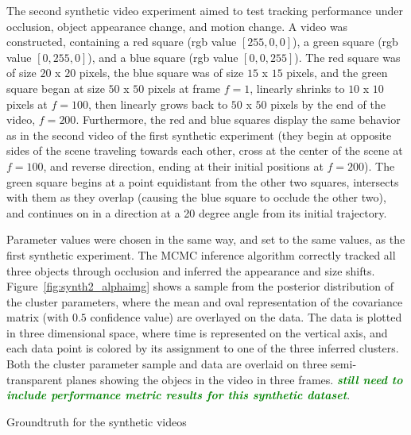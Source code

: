 \documentclass[smallcondensed, final]{svjour3}
\newcommand{\willie}[1]{\textcolor{green}{\textsf{\emph{\textbf{\textcolor{green}{#1}}}}}}
\begin{document}

The second synthetic video experiment aimed to test tracking performance under occlusion, object appearance change, and motion change. A video was constructed, containing a red square (rgb value $[255,0,0]$), a green square (rgb value $[0,255,0]$), and a blue square (rgb value $[0,0,255]$). The red square was of size $20$ x $20$ pixels, the blue square was of size $15$ x $15$ pixels, and the green square began at size $50$ x $50$ pixels at frame $f=1$, linearly shrinks to $10$ x $10$ pixels at $f=100$, then linearly grows back to $50$ x $50$ pixels by the end of the video, $f=200$. Furthermore, the red and blue squares display the same behavior as in the second video of the first synthetic experiment (they begin at opposite sides of the scene traveling towards each other, cross at the center of the scene at $f=100$, and reverse direction, ending at their initial positions at $f=200$). The green square begins at a point equidistant from the other two squares, intersects with them as they overlap (causing the blue square to occlude the other two), and continues on in a direction at a 20 degree angle from its initial trajectory.

Parameter values were chosen in the same way, and set to the same values, as the first synthetic experiment. The MCMC inference algorithm correctly tracked all three objects through occlusion and inferred the appearance and size shifts. Figure~\ref{fig:synth2_alphaimg} shows a sample from the posterior distribution of the cluster parameters, where the mean and oval representation of the covariance matrix (with $0.5$ confidence value) are overlayed on the data. The data is plotted in three dimensional space, where time is represented on the vertical axis, and each data point is colored by its assignment to one of the three inferred clusters. Both the cluster parameter sample and data are overlaid on three semi-transparent planes showing the objecs in the video in three frames. \willie{still need to include performance metric results for this synthetic dataset}.

Groundtruth for the synthetic videos 

\end{document}
